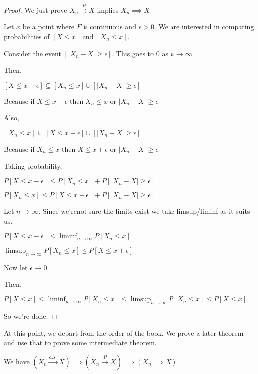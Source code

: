 \documentclass{article}
\theoremstyle{definition}
\begin{document}
\begin{proof}
    We just prove \(X_n \overset{P}{\to } X\) implies \(X_n \implies X\) 

    Let \(x\) be a point where \(F\) is continuous and \(\epsilon >0\). We are interested in comparing probabilities of \([X\leq x]\) and \([X_n\leq x]\).
    
    Consider the event \([\vert X_n - X \vert \geq \epsilon ]\). This goes to \(0\) as \(n \to \infty\) 

    Then,

    \([X\leq x-\epsilon] \subseteq [X_n\leq x] \cup [\vert X_n - X \vert \geq \epsilon]\) 

    Because if \(X \leq x - \epsilon\) then \(X_n \leq x\) or \(\vert X_n - X \vert \geq \epsilon\) 

    Also,

    \([X_n \leq x] \subseteq [X \leq x+\epsilon] \cup [\vert X_n - X \vert \geq \epsilon]\) 

    Because if \(X_n \leq x\) then \(X \leq x+\epsilon\) or \(\vert X_n - X \vert \geq \epsilon\) 

    Taking probability,

    \(P[X\leq x-\epsilon] \leq P[X_n \leq x]+P[\vert X_n - X \vert \geq \epsilon  ]\) 

    \(P[X_n \leq x] \leq P[X \leq x+\epsilon]+P[\vert X_n - X \vert \geq \epsilon]\) 

    Let \(n\to \infty\). Since we'renot sure the limits exist we take limsup/liminf as it suits us.

    \(P[X\leq x-\epsilon]\leq \liminf_{n \to \infty} P[X_n \leq x]\)
    
    \(\limsup_{n \to \infty} P[X_n \leq x]\leq P[X\leq x+\epsilon]\) 

    Now let \(\epsilon \to 0\)
    
    Then,

    \(P[X \leq x] \leq \liminf_{n \to \infty} P[X_n \leq x] \leq \limsup_{n \to \infty} P[X_n \leq x]\leq P[X\leq x]\)
    
    So we're done.

\end{proof}

At this point, we depart from the order of the book. We prove a later theorem and use that to prove some intermediate theorem.

We have \((X_n \overset{a.s.}{\to} X) \implies (X_n \overset{P}{\to } X) \implies (X_n \implies X)\).
\end{document}
